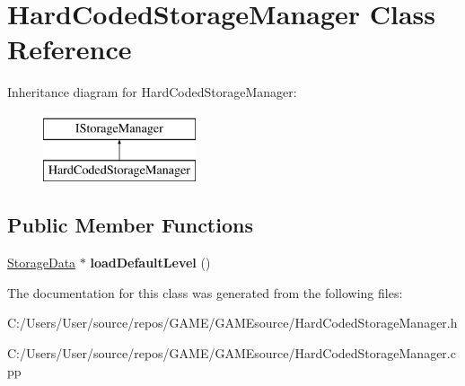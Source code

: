 \hypertarget{class_hard_coded_storage_manager}{}\section{Hard\+Coded\+Storage\+Manager Class Reference}
\label{class_hard_coded_storage_manager}
Inheritance diagram for Hard\+Coded\+Storage\+Manager\+:\begin{figure}[H]
\begin{center}
\leavevmode
\includegraphics[height=2.000000cm]{class_hard_coded_storage_manager}
\end{center}
\end{figure}
\subsection*{Public Member Functions}
\begin{DoxyCompactItemize}
\item 
\mbox{\label{class_hard_coded_storage_manager_a63cb0028398459428f52c88640daf274}} 
\mbox{\hyperlink{class_storage_data}{Storage\+Data}} $\ast$ {\bfseries load\+Default\+Level} ()
\end{DoxyCompactItemize}


The documentation for this class was generated from the following files\+:\begin{DoxyCompactItemize}
\item 
C\+:/\+Users/\+User/source/repos/\+G\+A\+M\+E/\+G\+A\+M\+Esource/Hard\+Coded\+Storage\+Manager.\+h\item 
C\+:/\+Users/\+User/source/repos/\+G\+A\+M\+E/\+G\+A\+M\+Esource/Hard\+Coded\+Storage\+Manager.\+cpp\end{DoxyCompactItemize}

